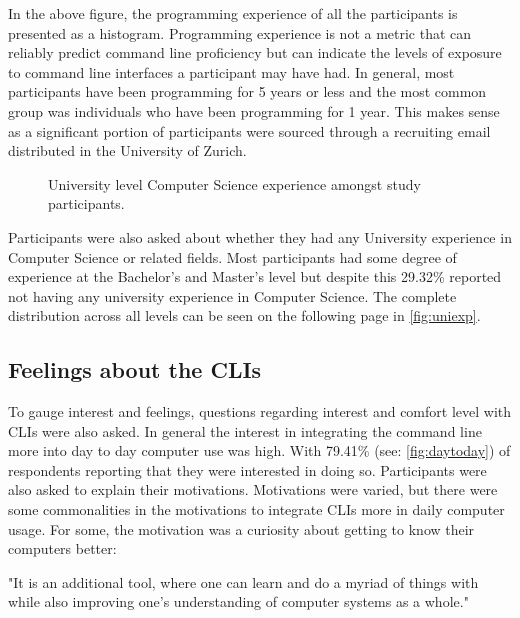 In the above figure, the programming experience of all the participants is
presented as a histogram. Programming experience is not a metric that can
reliably predict command line proficiency but can indicate the levels of
exposure to command line interfaces a participant may have had. In general,
most participants have been programming for 5 years or less and the most common
group was individuals who have been programming for 1 year. This makes sense as
a significant portion of participants were sourced through a recruiting email
distributed in the University of Zurich.

\begin{figure}[h]
	\centering
	\scalebox{0.8}{}
	\caption{University level Computer Science experience amongst study participants.}
	\label{fig:uniexp}
\end{figure}

Participants were also asked about whether they had any University experience
in Computer Science or related fields. Most participants had some degree of
experience at the Bachelor's and Master's level but despite this 29.32\%
reported not having any university experience in Computer Science. The complete
distribution across all levels can be seen on the following page in
\autoref{fig:uniexp}.

\FloatBarrier %


\subsection{Feelings about the CLIs}

To gauge interest and feelings, questions regarding interest and comfort level
with CLIs were also asked. In general the interest in integrating the command
line more into day to day computer use was high. With 79.41\% (see:
\autoref{fig:daytoday}) of respondents reporting that they were interested in
doing so. Participants were also asked to explain their motivations.
Motivations were varied, but there were some commonalities in the motivations
to integrate CLIs more in daily computer usage. For some, the motivation was a
curiosity about getting to know their computers better:

\begin{quotes}
	"It is an additional tool, where one can learn and do a myriad of things with while also
	improving one's understanding of computer systems as a whole."
\end{quotes}

